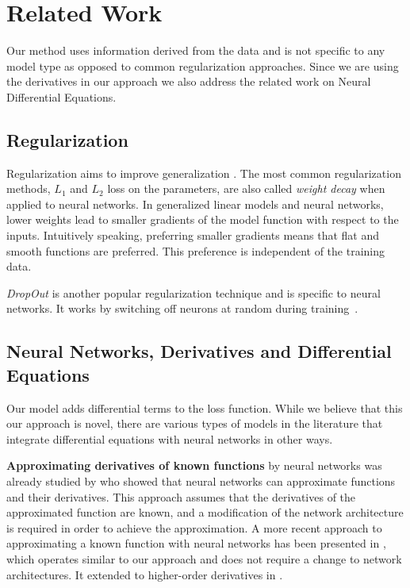 \documentclass[conference]{IEEEtran}
\begin{document}
\section{Related Work}\label{sec:related}

Our method uses information derived from the data and is not specific to any model type as opposed to common regularization approaches.
Since we are using the derivatives in our approach we also address the related work on Neural Differential Equations.

\subsection{Regularization}
Regularization aims to improve generalization \cite{Kukacka2017regsurvey}.
The most common regularization methods, $L_1$ and $L_2$ loss on the parameters, are also called \emph{weight decay} when applied to neural networks.
In generalized linear models and neural networks, lower weights lead to smaller gradients of the model function with respect to the inputs. 
Intuitively speaking, preferring smaller gradients means that flat and smooth functions are preferred. 
This preference is independent of the training data.

\emph{DropOut} is another popular regularization technique and is specific to neural networks. 
It works by switching off neurons at random during training~\cite{srivastava2014dropout,baldi2013understanding}. 

\subsection{Neural Networks, Derivatives and Differential Equations} 

Our model adds differential terms to the loss function. 
While we believe that this our approach is novel, there are various types of models in the literature that integrate differential equations with neural networks in other ways. 

\textbf{Approximating derivatives of known functions} by neural networks 
was already studied by \cite{hornik-et-al-1990-universal} who showed that neural networks can approximate functions and their derivatives. 
This approach assumes that the derivatives of the approximated function are known, and a modification of the network architecture is required in order to achieve the approximation. 
A more recent approach to approximating a known function with neural networks has been presented in \cite{Avrutskiy2017}, which operates similar to our approach and does not require a change to network architectures. 
It extended to higher-order derivatives in 
\cite{Avrutskiy2021}. 
\end{document}
